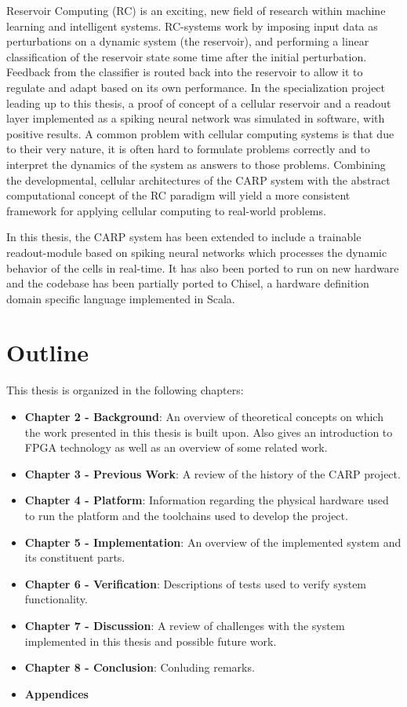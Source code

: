 Reservoir Computing (RC) is an exciting, new field of research within machine
learning and intelligent systems. RC-systems work by imposing input data as
perturbations on a dynamic system (the reservoir), and performing a linear
classification of the reservoir state some time after the initial perturbation.
Feedback from the classifier is routed back into the reservoir to allow it to
regulate and adapt based on its own performance. In the specialization project
leading up to this thesis, a proof of concept of a cellular reservoir and a
readout layer implemented as a spiking neural network was simulated in software,
with positive results. A common problem with cellular computing systems is that
due to their very nature, it is often hard to formulate problems correctly and
to interpret the dynamics of the system as answers to those problems. Combining
the developmental, cellular architectures of the CARP system with the abstract
computational concept of the RC paradigm will yield a more consistent framework
for applying cellular computing to real-world problems. 

In this thesis, the CARP system has been extended to include a trainable
readout-module based on spiking neural networks which processes the dynamic
behavior of the cells in real-time. It has also been ported to run on new
hardware and the codebase has been partially ported to Chisel, a hardware
definition domain specific language implemented in Scala.

\section{Outline}

This thesis is organized in the following chapters:

\begin{itemize}
\item \textbf{Chapter 2 - Background}: An overview of theoretical concepts on which the
  work presented in this thesis is built upon. Also gives an introduction to
  FPGA technology as well as an overview of some related work.
\item \textbf{Chapter 3 - Previous Work}: A review of the history of the CARP project.
\item \textbf{Chapter 4 - Platform}: Information regarding the physical hardware used to
  run the platform and the toolchains used to develop the project.
\item \textbf{Chapter 5 - Implementation}: An overview of the implemented system and its
  constituent parts.
\item \textbf{Chapter 6 - Verification}: Descriptions of tests used to verify system functionality.
\item \textbf{Chapter 7 - Discussion}: A review of challenges with the system implemented
  in this thesis and possible future work.
\item \textbf{Chapter 8 - Conclusion}: Conluding remarks.
\item \textbf{Appendices}
\end{itemize}

\cleardoublepage
